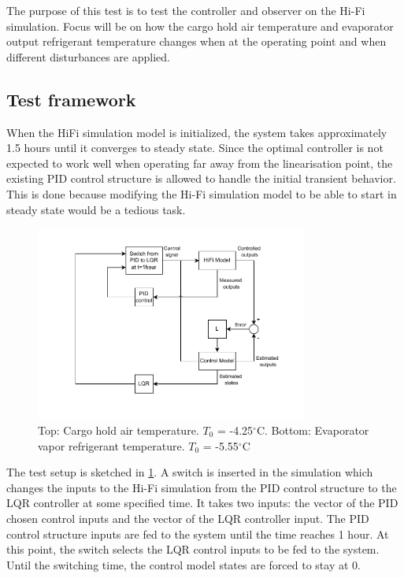 The purpose of this test is to test the controller and observer on the Hi-Fi simulation. Focus will be on how the cargo hold air temperature and evaporator output refrigerant temperature changes when at the operating point and when different disturbances are applied.

\subsection{Test framework}
When the HiFi simulation model is initialized, the system takes approximately 1.5 hours until it converges to steady state. Since the optimal controller is not expected to work well when operating far away from the linearisation point, the existing PID control structure is allowed to handle the initial transient behavior. This is done because modifying the Hi-Fi simulation model to be able to start in steady state would be a tedious task.

\begin{figure}[h!]
	\centering
	\includegraphics[width=0.8\textwidth]{Graphics/HiFi_simulation_test_diagram.pdf}
	\caption{Top: Cargo hold air temperature. $T_0$ = -4.25$^{\circ}$C. Bottom: Evaporator vapor refrigerant temperature. $T_0$ = -5.55$^{\circ}$C}
	\label{fig:test_setup}
\end{figure}

The test setup is sketched in \cref{fig:test_setup}. A switch is inserted in the simulation which changes the inputs to the Hi-Fi simulation from the PID control structure to the LQR controller at some specified time. It takes two inputs: the vector of the PID chosen control inputs and the vector of the LQR controller input. The PID control structure inputs are fed to the system until the time reaches 1 hour. At this point, the switch selects the LQR control inputs to be fed to the system. Until the switching time, the control model states are forced to stay at 0.

